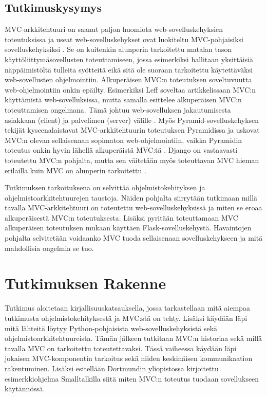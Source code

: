 \documentclass[utf8]{gradu3}
\begin{document}
\section{Tutkimuskysymys}
MVC-arkkitehtuuri on saanut paljon huomiota web-sovelluskehyksien
toteutuksissa ja useat web-sovelluskehykset ovat luokiteltu
MVC-pohjaisiksi sovelluskehyksiksi \parencite{mvcframeworks}. Se on kuitenkin alunperin
tarkoitettu matalan tason käyttöliittymäsovellusten toteuttamiseen,
jossa esimerkiksi hallitaan yksittäisiä näppäimistöltä tulleita
syötteitä eikä sitä ole suoraan tarkoitettu käytettäväksi
web-sovellusten ohjelmointiin. Alkuperäisen MVC:n toteutuksen
soveltuvuutta web-ohjelmointiin onkin epäilty. Esimerkiksi Leff
soveltaa artikkelissaan MVC:n käyttämistä web-sovelluksissa, mutta
samalla esittelee alkuperäisen MVC:n toteuttamisen ongelmana. Tämä johtuu web-sovelluksen jakautumisesta asiakkaan
(client) ja palvelimen (server) välille \parencite{ibm_watson}. Myös Pyramid-sovelluskehyksen tekijät
kyseenalaistavat MVC-arkkitehtuurin toteutuksen Pyramidissa ja uskovat
MVC:n olevan sellaisenaan sopimaton web-ohjelmointiin, vaikka
Pyramidin toteutus onkin hyvin lähellä alkuperäistä MVC:tä
\parencite{pyramid}. Django on vastaavasti toteutettu MVC:n pohjalta, mutta sen väitetään myös toteuttavan MVC hieman erilailla kuin MVC on alunperin tarkoitettu \parencite{django_mvc}.

Tutkimuksen tarkoituksena on selvittää ohjelmistokehityksen ja ohjelmistoarkkitehtuurejen taustoja. Näiden pohjalta siirrytään tutkimaan millä tavalla 
MVC-arkkitehtuuri on toteutettu web-sovelluskehyksissä ja miten se
eroaa alkuperäisestä MVC:n toteutuksesta. Lisäksi pyritään toteuttamaan MVC alkuperäisen
toteutuksen mukaan käyttäen Flask-sovelluskehystä\parencite{krasner}. Havaintojen pohjalta
selvitetään voidaanko MVC tuoda sellaisenaan sovelluskehykseen ja
mitä mahdollisia ongelmia se tuo.

\chapter{Tutkimuksen Rakenne}
Tutkimus aloitetaan kirjallisuuskatsauksella, jossa tarkastellaan mitä aiempaa 
tutkimusta ohjelmistokehityksestä ja MVC:stä on tehty. Lisäksi käydään
läpi mitä lähteitä löytyy Python-pohjaisista web-sovelluskehyksistä sekä ohjelmistoarkkitehtuureista. Tämän jälkeen 
tutkitaan MVC:n historiaa sekä millä tavalla MVC on tarkoitettu toteutettavaksi.
Tässä vaiheessa käydään läpi jokaisen MVC-komponentin tarkoitus sekä niiden 
keskinäisen kommunikaation rakentuminen. Lisäksi esitellään
Dortmundin yliopistossa kirjoitettu esimerkkiohjelma Smalltalkilla siitä miten MVC:n 
toteutus tuodaan sovellukseen käytännössä.
\end{document}
